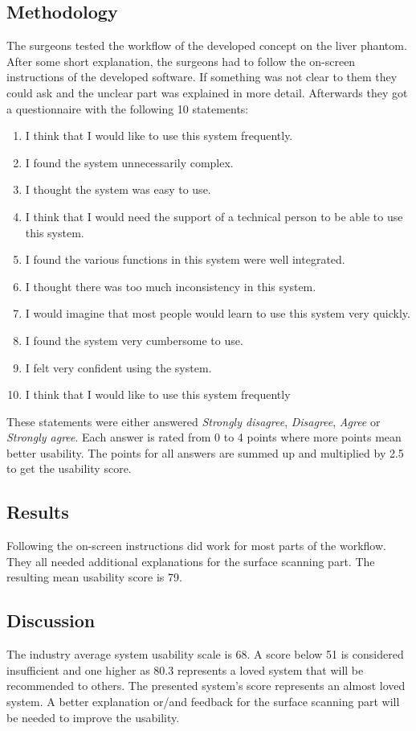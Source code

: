 \subsection{Methodology}
The surgeons tested the workflow of the developed concept on the liver phantom.
After some short explanation, the surgeons had to follow the on-screen
instructions of the developed software. If something was not clear to them they
could ask and the unclear part was explained in more detail. Afterwards they got
a questionnaire with the following 10 statements:
\begin{enumerate}
  \item{I think that I would like to use this system frequently.}
  \item{I found the system unnecessarily complex.}
  \item{I thought the system was easy to use.}
  \item{I think that I would need the support of a technical person to be able to use this system.}
  \item{I found the various functions in this system were well integrated.}
  \item{I thought there was too much inconsistency in this system.}
  \item{I would imagine that most people would learn to use this system very quickly.}
  \item{I found the system very cumbersome to use.}
  \item{I felt very confident using the system.}
  \item{I think that I would like to use this system frequently}
\end{enumerate}
These statements were either answered \textit{Strongly disagree},
\textit{Disagree}, \textit{Agree} or \textit{Strongly agree}. Each answer is
rated from 0 to 4 points where more points mean better usability. The points for
all answers are summed up and multiplied by 2.5 to get the usability score.
\subsection{Results}
Following the on-screen instructions did work for most parts of the workflow.
They all needed additional explanations for the surface scanning part. 
The resulting mean usability score is 79. 
\subsection{Discussion}
The industry average system usability scale is 68. A score below 51 is
considered insufficient and one higher as 80.3 represents a loved system that will be 
recommended to others. The presented system's score represents an almost loved
system. A better explanation or/and feedback for the surface scanning part will
be needed to improve the usability.

